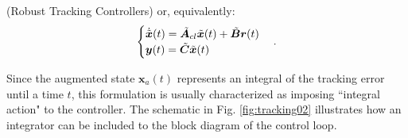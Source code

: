 \documentclass[a4paper,11pt]{book}
\numberwithin{figure}{chapter}
\numberwithin{equation}{chapter}
\numberwithin{table}{chapter}
\theoremstyle{definition}
\newtheorem{definition}{Definition}[chapter]
\newcounter{boxed-theorem}
\newcounter{boxed-lemma}
\newcounter{boxed-definition}
\newenvironment{boxed-definition}[1]
{\colorlet{shadecolor}{pastelYellow!15} \begin{shaded} \begin{definition}{#1}}
{\end{definition} \end{shaded}}
\newcounter{boxed-example}
\begin{document}
\begin{boxed-definition}{(Robust Tracking Controllers)}
    \noindent or, equivalently:
    \begin{align}
    \begin{cases}
        \dot{\tilde{\bm{x}}}(t) = \tilde{\bm{A}}_{cl} \tilde{\bm{x}}(t) + \tilde{\bm{B}} \bm{r}(t) \\
        \bm{y}(t) = \tilde{\bm{C}} \tilde{\bm{x}}(t) \hfill
    \end{cases}
    .\end{align}
\end{boxed-definition}

Since the augmented state $\bm{x}_a(t)$ represents an integral of the tracking error until a time $t$, this formulation is usually characterized as imposing ``integral action" to the controller. The schematic in Fig. \ref{fig:tracking02} illustrates how an integrator can be included to the block diagram of the control loop.
\end{document}
